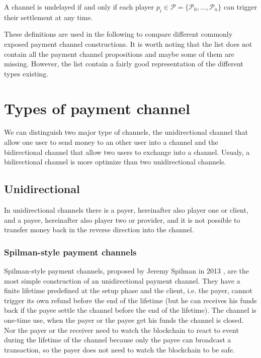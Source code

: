 \begin{definition}[undelayed]
  A channel is undelayed if and only if each player $p_i \in \mathcal{P} = \{\mathcal{P}_0,
  \dots, \mathcal{P}_n\}$ can trigger their settlement at any time.
\end{definition}

These definitions are used in the following to compare different commonly exposed
payment channel constructions. It is worth noting that the list does not contain all
the payment channel propositions and maybe some of them are missing. However, the
list contain a fairly good representation of the different types existing.

\minitoc

\newpage

\section{Types of payment channel}

We can distinguish two major type of channels, the unidirectional channel that allow
one user to send money to an other user into a channel and the bidirectional channel
that allow two users to exchange into a channel. Usualy, a bidirectional channel is
more optimize than two unidirectional channels.

\subsection{Unidirectional}

In unidirectional channels there is a payer, hereinafter also player one or client, and
a payee, hereinafter also player two or provider, and it is not possible to transfer
money back in the reverse direction into the channel.

\subsubsection{Spilman-style payment channels}

Spilman-style payment channels, proposed by Jeremy Spilman in 2013 \cite{SpilmanStyle},
are the most simple construction of an unidirectional
payment channel. They have a finite lifetime predefined at the setup phase and the client,
i.e. the payer, cannot trigger its own refund before the end of the lifetime (but he can
receives his funds back if the payee settle the channel before the end of the lifetime).
The channel is one-time use, when the payer or the payee get his funds the channel is
closed. Nor the payer or the receiver need to watch the blockchain to react to event
during the lifetime of the channel because only the payee can broadcast a transaction,
so the payer does not need to watch the blockchain to be safe.

